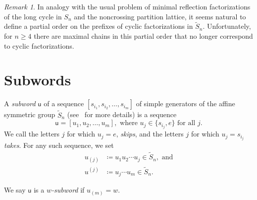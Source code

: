\documentclass[a4paper,10pt,leqno]{amsart}
\newcommand{\darkred}{\color{darkred}}
\numberwithin{equation}{section}
\theoremstyle{definition}
\theoremstyle{remark}
\newtheorem{remark}[theorem]{Remark}
\renewcommand{\u}{\mathsf{u}}
\newcommand{\AS}{\widetilde{S}}
\newcommand{\rrT}{\rr^T}
\newcommand{\rr}{\mathsf{r}}
\newcommand{\Trr}{T^\rr}
\newcommand{\defn}[1]{\emph{\darkred #1}}
\begin{document}
\begin{remark}
In analogy with the usual problem of minimal reflection factorizations of the long cycle in $S_n$ and the noncrossing partition lattice, it seems natural to define a partial order on the prefixes of cyclic factorizations in $\AS_n$.  Unfortunately, for $n\geq 4$ there are maximal chains in this partial order that no longer correspond to cyclic factorizations.
\end{remark}

\section{Subwords}
\label{sec:subwords}

A \defn{subword} $\u$ of a sequence $[s_{i_1},s_{i_2},\ldots, s_{i_m}]$ of simple generators of the affine symmetric group $\AS_n$ (see~ for more details) is a sequence \[\mathsf{u}=[u_1,u_2,\dots,u_m], \text{ where } u_j\in\{s_{i_j},e\} \text{ for all } j.\]  We call the letters $j$ for which $u_j=e$, \defn{skips}, and the letters $j$ for which $u_j = s_{i_j}$ \defn{takes}.  For any such sequence, we set
\begin{align}\label{eq:partial_prod}
u_{(j)} &\coloneqq u_1u_2\cdots u_j \in \AS_n, \text{ and}\\
u^{(j)} &\coloneqq u_j\cdots u_{m} \in \AS_n.\nonumber
\end{align}

We say $\u$ is a \defn{$w$-subword} if $u_{(m)}=w$. 
\end{document}
